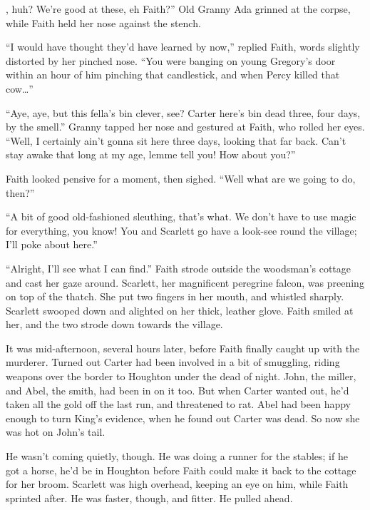 
, huh?
We're good at these, eh Faith?''
Old Granny Ada grinned at the corpse, while Faith held her nose against the stench.

``I would have thought they'd have learned by now,''
replied Faith, words slightly distorted by her pinched nose.
``You were banging on young Gregory's door within an hour of him pinching that candlestick, and when Percy killed that cow{\dots}''

``Aye, aye, but this fella's bin clever, see?
Carter here's bin dead three, four days, by the smell.''
Granny tapped her nose and gestured at Faith, who rolled her eyes.
``Well, I certainly ain't gonna sit here three days, looking that far back.
Can't stay awake that long at my age, lemme tell you!
How about you?''

Faith looked pensive for a moment, then sighed.
``Well what are we going to do, then?''

``A bit of good old-fashioned sleuthing, that's what.
We don't have to use magic for everything, you know!
You and Scarlett go have a look-see round the village;
I'll poke about here.''

\newcommand\foretellingstoryrepeat{%
	``Alright, I'll see what I can find.''
	Faith strode outside the woodsman's cottage and cast her gaze around.
	Scarlett, her magnificent peregrine falcon, was preening on top of the thatch.
	She put two fingers in her mouth,
}%
{\foretellingstoryrepeat}
and whistled sharply.
Scarlett swooped down and alighted on her thick, leather glove.
Faith smiled at her, and the two strode down towards the village.

\storybreak

It was mid-afternoon, several hours later, before Faith finally caught up with the murderer.
Turned out Carter had been involved in a bit of smuggling, riding weapons over the border to Houghton under the dead of night.
John, the miller, and Abel, the smith, had been in on it too.
But when Carter wanted out, he'd taken all the gold off the last run, and threatened to rat.
Abel had been happy enough to turn King's evidence, when he found out Carter was dead.
So now she was hot on John's tail.

He wasn't coming quietly, though.
He was doing a runner for the stables; if he got a horse, he'd be in Houghton before Faith could make it back to the cottage for her broom.
Scarlett was high overhead, keeping an eye on him, while Faith sprinted after.
He was faster, though, and fitter.
He pulled ahead.

